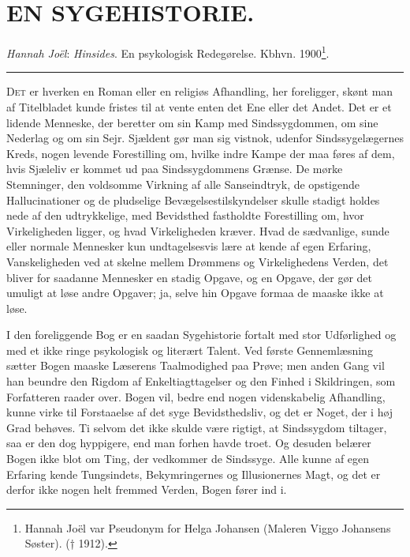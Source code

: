 \documentclass[12pt,a4paper,openany]{book}
\newcommand{\opage}[1]{\marginnote{\footnotesize\textit{[#1]}}}
\newcommand{\essay}[2][]{\chapter*{#2}\addcontentsline{toc}{chapter}{#1}}   %
\newcommand{\undertitel}[1]{\begin{center}\small #1\end{center}}   %
\newcommand{\streg}{\begin{center}\rule{3em}{0.4pt}\end{center}}
\begin{document}
\setcounter{footnote}{0}%
\opage{78}\essay[En Sygehistorie (1901)]{EN SYGEHISTORIE.}
\undertitel{\emph{Hannah Joël}: \textit{Hinsides}. En psykologisk Redegørelse. Kbhvn. 1900\footnote[1]{Hannah Joël var Pseudonym for Helga Johansen (Maleren Viggo Johansens Søster). († 1912).}.}
\streg

D\textsc{et} er hverken en Roman eller en religiøs Afhandling, her
foreligger, skønt man af Titelbladet kunde fristes til at
vente enten det Ene eller det Andet. Det er et lidende Menneske,
der beretter om sin Kamp med Sindssygdommen, om
sine Nederlag og om sin Sejr. Sjældent gør man sig vistnok,
udenfor Sindssygelægernes Kreds, nogen levende Forestilling
om, hvilke indre Kampe der maa føres af dem, hvis Sjæleliv
er kommet ud paa Sindssygdommens Grænse. De mørke Stemninger,
den voldsomme Virkning af alle Sanseindtryk, de opstigende
Hallucinationer og de pludselige Bevægelsestilskyndelser
skulle stadigt holdes nede af den udtrykkelige, med
Bevidsthed fastholdte Forestilling om, hvor Virkeligheden ligger,
og hvad Virkeligheden kræver. Hvad de sædvanlige, sunde
eller normale Mennesker kun undtagelsesvis lære at kende af
egen Erfaring, Vanskeligheden ved at skelne mellem Drømmens
og Virkelighedens Verden, det bliver for saadanne Mennesker
en stadig Opgave, og en Opgave, der gør det umuligt at løse
andre Opgaver; ja, selve hin Opgave formaa de maaske ikke
at løse.

I den foreliggende Bog er en saadan Sygehistorie fortalt
med stor Udførlighed og med et ikke ringe psykologisk og literært
Talent. Ved første Gennemlæsning sætter Bogen maaske
Læserens Taalmodighed paa Prøve; men anden Gang vil han
\setcounter{footnote}{0}%
\opage{79}beundre den Rigdom af Enkeltiagttagelser og den Finhed i
Skildringen, som Forfatteren raader over. Bogen vil, bedre
end nogen videnskabelig Afhandling, kunne virke til Forstaaelse
af det syge Bevidsthedsliv, og det er Noget, der i høj Grad
behøves. Ti selvom det ikke skulde være rigtigt, at Sindssygdom
tiltager, saa er den dog hyppigere, end man forhen
havde troet. Og desuden belærer Bogen ikke blot om Ting,
der vedkommer de Sindssyge. Alle kunne af egen Erfaring
kende Tungsindets, Bekymringernes og Illusionernes Magt, og
det er derfor ikke nogen helt fremmed Verden, Bogen fører
ind i.
\end{document}
